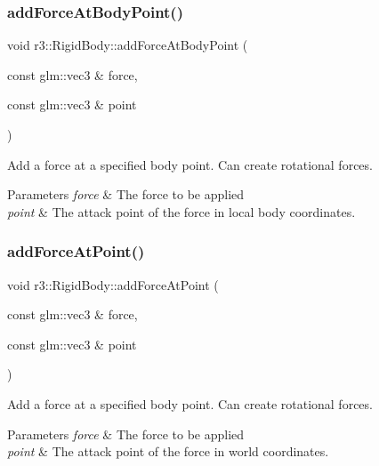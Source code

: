 \subsubsection{\texorpdfstring{add\+Force\+At\+Body\+Point()}{addForceAtBodyPoint()}}
{\footnotesize\ttfamily void r3\+::\+Rigid\+Body\+::add\+Force\+At\+Body\+Point (\begin{DoxyParamCaption}\item[{const glm\+::vec3 \&}]{force,  }\item[{const glm\+::vec3 \&}]{point }\end{DoxyParamCaption})}



Add a force at a specified body point. Can create rotational forces. 


\begin{DoxyParams}{Parameters}
{\em force} & The force to be applied \\
\hline
{\em point} & The attack point of the force in local body coordinates. \\
\hline
\end{DoxyParams}
\mbox{\label{classr3_1_1_rigid_body_a9e8fc5409e15ae0184baf3238b97dec7}} 
\subsubsection{\texorpdfstring{add\+Force\+At\+Point()}{addForceAtPoint()}}
{\footnotesize\ttfamily void r3\+::\+Rigid\+Body\+::add\+Force\+At\+Point (\begin{DoxyParamCaption}\item[{const glm\+::vec3 \&}]{force,  }\item[{const glm\+::vec3 \&}]{point }\end{DoxyParamCaption})}



Add a force at a specified body point. Can create rotational forces. 


\begin{DoxyParams}{Parameters}
{\em force} & The force to be applied \\
\hline
{\em point} & The attack point of the force in world coordinates. \\
\hline
\end{DoxyParams}
\mbox{\label{classr3_1_1_rigid_body_aaa3f92c7abc8b733a3dac8841ff41b61}} 
